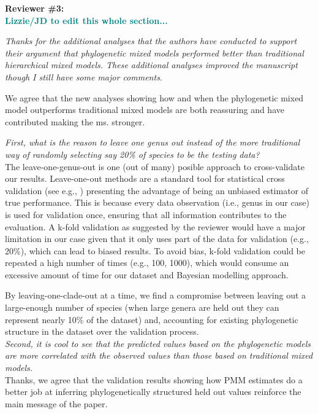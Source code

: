 \documentclass[11pt]{article}
\begin{document}
{\bf Reviewer \#3:}\\ \textcolor{teal}{{\bf Lizzie/JD to edit this whole section...}}


\emph{Thanks for the additional analyses that the authors have conducted to support their argument that phylogenetic mixed models performed better than traditional hierarchical mixed models. These additional analyses improved the manuscript though I still have some major comments.}

We agree that the new analyses showing how and when the phylogenetic mixed model outperforms traditional mixed models are both reassuring and have contributed making the ms. stronger.


\emph{First, what is the reason to leave one genus out instead of the more traditional way of randomly selecting say 20\% of species to be the testing data? }\\



The leave-one-genus-out is one (out of many) posible approach to cross-validate our results. Leave-one-out methods are a standard tool for statistical cross validation (see e.g., ) presenting the advantage of being an unbiased estimator of true performance. This is because every data observation (i.e., genus in our case) is used for validation once, ensuring that all information contributes to the evaluation. A k-fold validation as suggested by the reviewer would have a major limitation in our case given that it only uses part of the data for validation (e.g., 20\%), which can lead to biased results. To avoid bias, k-fold validation could be repeated a high number of times (e.g., 100, 1000), which would consume an excessive amount of time for our dataset and Bayesian modelling approach.

By leaving-one-clade-out at a time, we find a compromise between leaving out a large-enough number of species (when large genera are held out they can represent nearly 10\% of the dataset) and, accounting for existing phylogenetic structure in the dataset over the validation process.\\


\emph{Second, it is cool to see that the predicted values based on the phylogenetic models are more correlated with the observed values than those based on traditional mixed models. }\\

Thanks, we agree that the validation results showing how PMM estimates do a better job at inferring phylogenetically structured held out values reinforce the main message of the paper.\\
\end{document}
